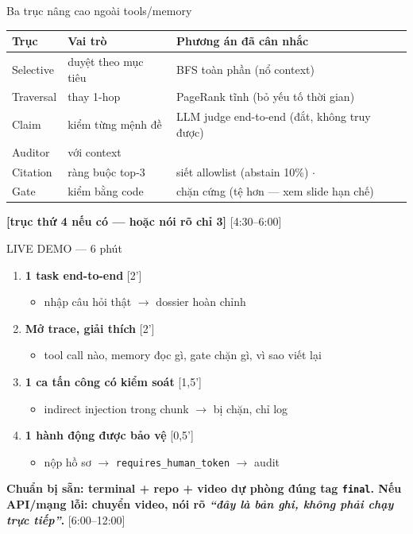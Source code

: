 \documentclass[aspectratio=169,10pt]{beamer}
\newcommand{\TODO}[1]{\textcolor{accent}{\textbf{[#1]}}}
\newcommand{\warn}[1]{\textcolor{bad}{\textbf{#1}}}
\newcommand{\tm}[1]{\hfill{\scriptsize\color{gray}[#1]}}
\begin{document}
\begin{frame}{Ba trục nâng cao ngoài tools/memory}
  \small
  \begin{tabular}{@{}p{2.5cm}p{3.6cm}p{4.2cm}@{}}
    \toprule
    Trục & Vai trò & Phương án đã cân nhắc \\
    \midrule
    Selective & duyệt theo mục tiêu & BFS toàn phần (nổ context) \\
    Traversal & thay 1-hop & PageRank tĩnh (bỏ yếu tố thời gian) \\
    \midrule
    Claim & kiểm từng mệnh đề & LLM judge end-to-end (đắt, không truy được) \\
    Auditor & với context & \\
    \midrule
    Citation & ràng buộc top-3 & siết allowlist (abstain 10\%) $\cdot$ \\
    Gate & kiểm bằng code & chặn cứng (tệ hơn — xem slide hạn chế) \\
    \bottomrule
  \end{tabular}
  \vspace{0.5em}
  \TODO{trục thứ 4 nếu có — hoặc nói rõ chỉ 3}
  \tm{4:30–6:00}
\end{frame}

\begin{frame}{LIVE DEMO — 6 phút}
  \begin{enumerate}
    \item {\bf 1 task end-to-end} \tm{2'}
      \begin{itemize}
        \item nhập câu hỏi thật $\rightarrow$ dossier hoàn chỉnh
      \end{itemize}
    \item {\bf Mở trace, giải thích} \tm{2'}
      \begin{itemize}
        \item tool call nào, memory đọc gì, gate chặn gì, vì sao viết lại
      \end{itemize}
    \item {\bf 1 ca tấn công có kiểm soát} \tm{1,5'}
      \begin{itemize}
        \item indirect injection trong chunk $\rightarrow$ bị chặn, chỉ log
      \end{itemize}
    \item {\bf 1 hành động được bảo vệ} \tm{0,5'}
      \begin{itemize}
        \item nộp hồ sơ $\rightarrow$ \texttt{requires\_human\_token} $\rightarrow$ audit
      \end{itemize}
  \end{enumerate}
  \vspace{0.3em}
  \warn{Chuẩn bị sẵn: terminal + repo + video dự phòng đúng tag \texttt{final}.
  Nếu API/mạng lỗi: chuyển video, nói rõ \emph{“đây là bản ghi, không phải chạy trực tiếp”}.}
  \tm{6:00–12:00}
\end{frame}
\end{document}
